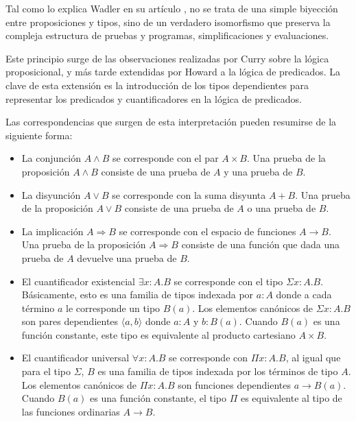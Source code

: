 Tal como lo explica Wadler en su artículo \cite{pas}, no se trata de una simple biyección entre proposiciones y tipos, sino de un verdadero isomorfismo que preserva la compleja estructura de pruebas y programas, simplificaciones y evaluaciones.

Este principio surge de las observaciones realizadas por Curry \cite{Curry} sobre la lógica proposicional, y más tarde extendidas por Howard \cite{Howard} a la lógica de predicados.
La clave de esta extensión es la introducción de los tipos dependientes para representar los predicados y cuantificadores en la lógica de predicados.

Las correspondencias que surgen de esta interpretación pueden resumirse de la siguiente forma:

\begin{itemize}
	\item La conjunción $A \wedge B$ se corresponde con el par $A \times B$.
	Una prueba de la proposición $A \wedge B$ consiste de una prueba de $A$ y una prueba de $B$.
	
	\item La disyunción $A \vee B$ se corresponde con la suma disyunta $A + B$.
	Una prueba de la proposición $A \vee B$ consiste de una prueba de $A$ o una prueba de $B$.
	
	\item La implicación $A \Rightarrow B$ se corresponde con el espacio de funciones $A \rightarrow B$.
	Una prueba de la proposición $A \Rightarrow B$ consiste de una función que dada una prueba de $A$ devuelve una prueba de $B$.
	
	\item El cuantificador existencial $\exists x:A.B$ se corresponde con el tipo $\Sigma x:A.B$.
	Básicamente, esto es una familia de tipos indexada por $a : A$ donde a cada término $a$ le corresponde un tipo $B(a)$.
	Los elementos canónicos de $\Sigma x:A.B$ son pares dependientes $\langle a, b \rangle$ donde $a:A$ y $b:B(a)$.
	Cuando $B(a)$ es una función constante, este tipo es equivalente al producto cartesiano $A \times B$.
	
	
	\item El cuantificador universal $\forall x:A.B$ se corresponde con $\Pi x:A.B$, al igual que para el tipo $\Sigma$, $B$ es una familia de tipos indexada por los términos de tipo $A$.
	Los elementos canónicos de $\Pi x:A.B$ son funciones dependientes $a \rightarrow B(a)$.
	Cuando $B(a)$ es una función constante, el tipo $\Pi$ es equivalente al tipo de las funciones ordinarias $A \rightarrow B$.
\end{itemize}


